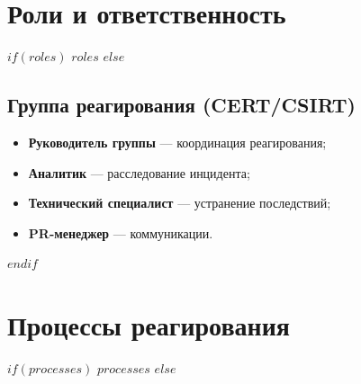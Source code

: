 \documentclass[14pt,a4paper]{extarticle}
\begin{document}
\section{Роли и ответственность}
\label{sec:roles}

$if(roles)$
$roles$
$else$
\subsection{Группа реагирования (CERT/CSIRT)}
\begin{itemize}
    \item \textbf{Руководитель группы} — координация реагирования;
    \item \textbf{Аналитик} — расследование инцидента;
    \item \textbf{Технический специалист} — устранение последствий;
    \item \textbf{PR-менеджер} — коммуникации.
\end{itemize}
$endif$

\section{Процессы реагирования}
\label{sec:processes}

$if(processes)$
$processes$
$else$
\end{document}
